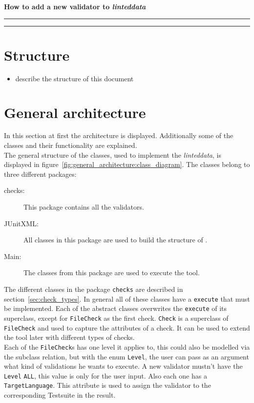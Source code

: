 \documentclass[11pt,a4paper]{article}
\newcommand{\function}[1]{\texttt{#1}}
\newcommand{\class}[1]{\texttt{#1}}
\newcommand{\enum}[1]{\texttt{#1}}
\newcommand{\package}[1]{\texttt{#1}}
\newcommand{\toolname}{\textit{linteddata}}
\begin{document}
\begin{center}
\begin{LARGE}
\textbf{How to add a new validator to \toolname}
\end{LARGE}
\end{center}
\hrule
\tableofcontents
\bigskip
\hrule
%
\section{Structure}
%
\begin{itemize}
	\item describe the structure of this document
\end{itemize}
%
\section{General architecture}
%
In this section at first the architecture is displayed. 
Additionally some of the classes and their functionality are explained.  
\\ 
The general structure of the classes, used to implement the \toolname , is displayed in figure~\ref{fig:general_architecture:class_diagram}. 
The classes belong to three different packages: 
\begin{description}
	\item[checks:] This package contains all the validators. 
	\item[JUnitXML:] All classes in this package are used to build the structure of \cite{JUnitXML_ibm}. 
	\item[Main:] The classes from this package are used to execute the tool. 
\end{description}
%
The different classes in the package \package{checks} are described in section~\ref{sec:check_types}. 
In general all of these classes have a \function{execute} that must be implemented. 
Each of the abstract classes overwrites the \function{execute} of its superclass, except for \class{FileCheck} as the first check. 
\class{Check} is a superclass of \class{FileCheck} and used to capture the attributes of a check. 
It can be used to extend the tool later with different types of checks. 
\\
Each of the \class{FileCheck}s has one level it applies to, this could also be modelled via the subclass relation, but with the enum \enum{Level}, the user can pass as an argument what kind of validations he wants to execute. 
A new validator mustn't have the \enum{Level} \enum{ALL}, this value is only for the user input. 
Also each one has a \enum{TargetLanguage}. 
This attribute is used to assign the validator to the corresponding Testsuite in the result. 
\end{document}
